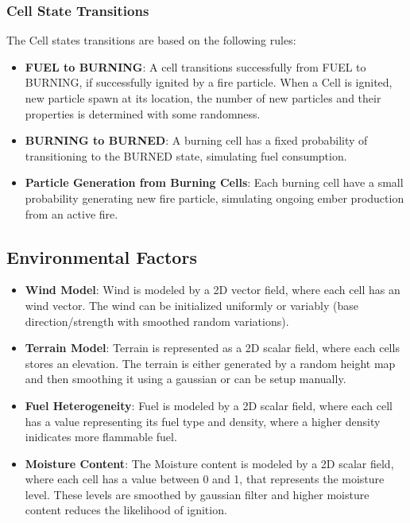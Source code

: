 \subsubsection{Cell State Transitions}
The Cell states transitions are based on the following rules:
\begin{itemize}
	\item \textbf{FUEL to BURNING}: A cell transitions successfully from FUEL to BURNING, if successfully ignited by a fire particle. When a Cell is ignited, new particle spawn at its location, the number of new particles and their properties is determined with some randomness.
	\item \textbf{BURNING to BURNED}: A burning cell has a fixed probability of transitioning to the BURNED state, simulating fuel consumption.
	\item \textbf{Particle Generation from Burning Cells}: Each burning cell have a small probability generating new fire particle, simulating ongoing ember production from an active fire.
\end{itemize}
\subsection{Environmental Factors}
\begin{itemize}
	\item \textbf{Wind Model}: Wind is modeled by a 2D vector field, where each cell has an wind vector. The wind can be initialized uniformly or variably (base direction/strength with smoothed random variations).
	\item \textbf{Terrain Model}: Terrain is represented as a 2D scalar field, where each cells stores an elevation. The terrain is either generated by a random height map and then smoothing it using a gaussian or can be setup manually.
	\item \textbf{Fuel Heterogeneity}: Fuel is modeled by a 2D scalar field, where each cell has a value representing its fuel type and density, where a higher density inidicates more flammable fuel.
	\item \textbf{Moisture Content}: The Moisture content is modeled by a 2D scalar field, where each cell has a value between 0 and 1, that represents the moisture level. These levels are smoothed by gaussian filter and higher moisture content reduces the likelihood of ignition.
\end{itemize}

